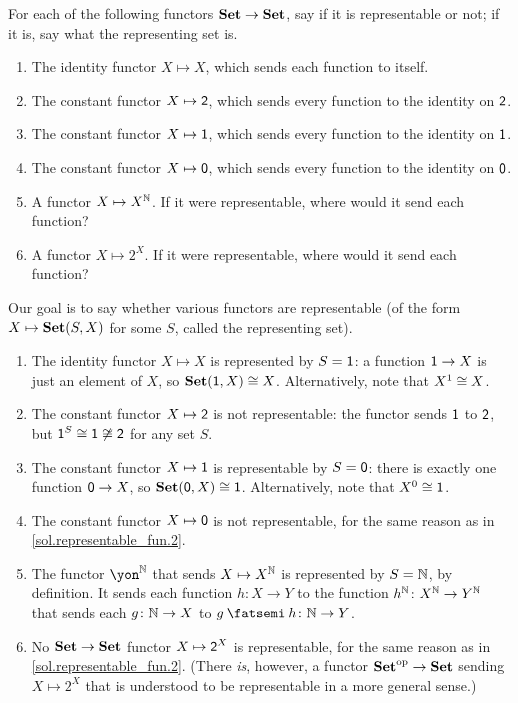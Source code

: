 \documentclass[Book-Poly]{subfiles}
\begin{document}
\begin{exercise}\label{exc.representable_fun}
For each of the following functors $\textbf{Set}\to\textbf{Set}$, say if it is representable or not; if it is, say what the representing set is.
\begin{enumerate}
	\item The identity functor $X\mapsto X$, which sends each function to itself.
	\item The constant functor $X\mapsto\textsf{2}$, which sends every function to the identity on $\textsf{2}$.
	\item The constant functor $X\mapsto\textsf{1}$, which sends every function to the identity on $\textsf{1}$.
	\item The constant functor $X\mapsto\textsf{0}$, which sends every function to the identity on $\textsf{0}$.
	\item A functor $X\mapsto X^{\mathbb{N}}$.
	If it were representable, where would it send each function?
	\item A functor $X\mapsto 2^X$.
	If it were representable, where would it send each function?
\qedhere
\end{enumerate}

\begin{solution}
Our goal is to say whether various functors are representable (of the form $X\mapsto\textbf{Set}(S,X)$ for some $S$, called the representing set).
\begin{enumerate}
	\item The identity functor $X\mapsto X$ is represented by $S=\textsf{1}$: a function $\textsf{1} \to X$ is just an element of $X$, so $\textbf{Set}(\textsf{1},X) \cong X$.
	Alternatively, note that $X^1 \cong X$.
	\item \label{sol.representable_fun.2} The constant functor $X\mapsto\textsf{2}$ is not representable: the functor sends $\textsf{1}$ to $\textsf{2}$, but $\textsf{1}^S \cong \textsf{1} \not\cong \textsf{2}$ for any set $S$.
	\item The constant functor $X\mapsto\textsf{1}$ is representable by $S=\textsf{0}$: there is exactly one function $\textsf{0} \to X$, so $\textbf{Set}(\textsf{0},X) \cong \textsf{1}$.
	Alternatively, note that $X^0 \cong \textsf{1}$.
	\item The constant functor $X\mapsto\textsf{0}$ is not representable, for the same reason as in \cref{sol.representable_fun.2}.
	\item The functor $\yon^\nn$ that sends $X\mapsto X^{\mathbb{N}}$ is represented by $S=\mathbb{N}$, by definition.
	It sends each function $h \colon X \to Y$ to the function $h^{\mathbb{N}} \colon X^{\mathbb{N}} \to Y^{\mathbb{N}}$ that sends each $g \colon \mathbb{N} \to X$ to $g \then h \colon \nn \to Y$.
	\item No $\textbf{Set} \to \textbf{Set}$ functor $X\mapsto \textsf{2}^X$ is representable, for the same reason as in \cref{sol.representable_fun.2}.
	(There \emph{is}, however, a functor $\textbf{Set}^{\textnormal{op}} \to \textbf{Set}$ sending $X \mapsto 2^X$ that is understood to be representable in a more general sense.)
\end{enumerate}
\end{solution}
\end{exercise}
\end{document}
